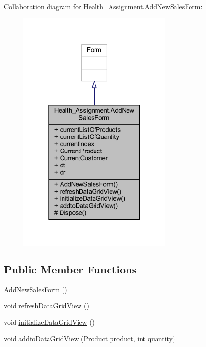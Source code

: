 Collaboration diagram for Health\+\_\+\+Assignment.\+Add\+New\+Sales\+Form\+:\nopagebreak
\begin{figure}[H]
\begin{center}
\leavevmode
\includegraphics[width=220pt]{class_health___assignment_1_1_add_new_sales_form__coll__graph}
\end{center}
\end{figure}
\subsection*{Public Member Functions}
\begin{DoxyCompactItemize}
\item 
\hyperlink{class_health___assignment_1_1_add_new_sales_form_a15182fa3a76cf8c841a0f7870dd2a3a1}{Add\+New\+Sales\+Form} ()
\item 
void \hyperlink{class_health___assignment_1_1_add_new_sales_form_ae2665848dd24d9f2216f247b1a06f450}{refresh\+Data\+Grid\+View} ()
\item 
void \hyperlink{class_health___assignment_1_1_add_new_sales_form_a18626a62a688c5056aa5a1c72ae981c4}{initialize\+Data\+Grid\+View} ()
\item 
void \hyperlink{class_health___assignment_1_1_add_new_sales_form_a0ec61d9adb44c2ad05bcdd23dcebecf1}{addto\+Data\+Grid\+View} (\hyperlink{class_health___assignment_1_1_product}{Product} product, int quantity)
\end{DoxyCompactItemize}
